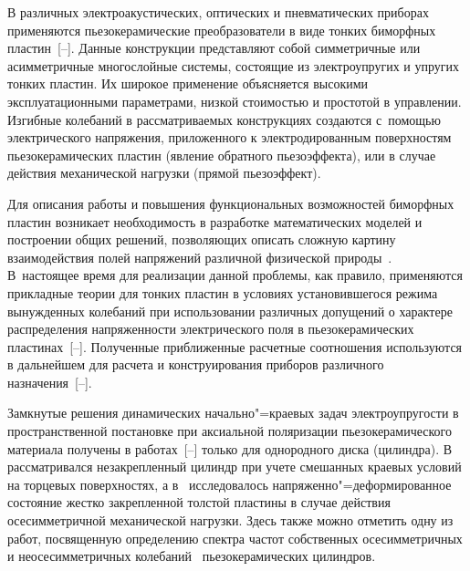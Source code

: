 \date{}

\renewcommand{\JournalDataOnline}{\displaydate{shlyakine}}

\vspace{5mm}

\makerutitle



 В различных электроакустических, оптических и 
пневматических приборах применяются пьезокерамические преобразователи в виде 
тонких биморфных пластин~[--]. Данные конструкции представляют собой 
симметричные или асимметричные многослойные системы, состоящие из 
электроупругих и упругих тонких пластин. 
Их широкое применение объясняется 
высокими эксплуатационными параметрами, низкой стоимостью и простотой в 
управлении. 
Изгибные колебаний в рассматриваемых конструкциях создаются с~помощью электрического напряжения, приложенного к электродированным поверхностям пьезокерамических пластин (явление обратного пьезоэффекта), или 
в случае действия механической нагрузки (прямой пьезоэффект).

Для описания работы и повышения функциональных возможностей биморфных 
пластин возникает необходимость в разработке математических моделей и 
построении общих решений, позволяющих описать сложную картину взаимодействия 
полей напряжений различной физической природы~\cite{shlya:bib4}. 
В~настоящее время для  реализации данной проблемы, как правило, применяются прикладные теории для 
тонких пластин в условиях установившегося режима вынужденных колебаний при 
использовании различных допущений о характере распределения напряженности 
электрического поля в пьезокерамических пластинах~[--]. Полученные 
приближенные расчетные соотношения используются в дальнейшем для расчета и 
конструирования приборов различного назначения~[--]. 

Замкнутые решения динамических начально"=краевых задач электроупругости в 
пространственной постановке при аксиальной поляризации пьезокерамического 
материала получены в работах~[--] только для однородного диска 
(цилиндра). В~\cite{shlya:bib17} рассматривался незакрепленный цилиндр при учете смешанных 
краевых условий на торцевых поверхностях, а в~\cite{shlya:bib18} исследовалось 
напряженно"=деформированное состояние жестко закрепленной толстой пластины в 
случае действия осесимметричной механической нагрузки. Здесь также можно 
отметить одну из работ, посвященную определению спектра частот собственных 
осесимметричных и неосесимметричных колебаний~\cite{shlya:bib19} пьезокерамических  
цилиндров.

